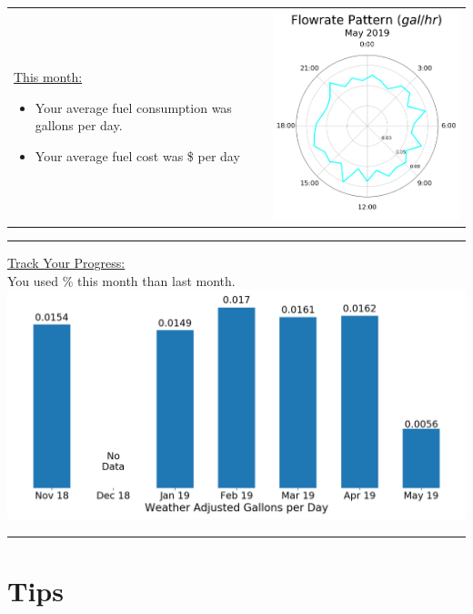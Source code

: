 \documentclass[12pt,a4paper]{article}
\begin{document}
\begin{tabu}{X[m,c]X[m,c]}

	\underline{This month:}
	
	\begin{itemize}
	
	\item Your average fuel consumption was {\fuelperday} gallons per day.
	\item Your average fuel cost was \${\fuelcostperday} per day

	\end{itemize}

	&
	
	\includegraphics[width = 3in]{monthly_polar_plot.png}

\end{tabu}

\vspace{12pt}
\rule{\textwidth}{1pt}
\vspace{12pt}

\underline{Track Your Progress:}\\

You used {\progress}\% {\progressmoreless} this month than last month.\\

\includegraphics[width = 6in]{monthly_track_your_progress.png}

\vspace{12pt}
\rule{\textwidth}{1pt}
\vspace{12pt}

\section*{Tips}

\end{document}
